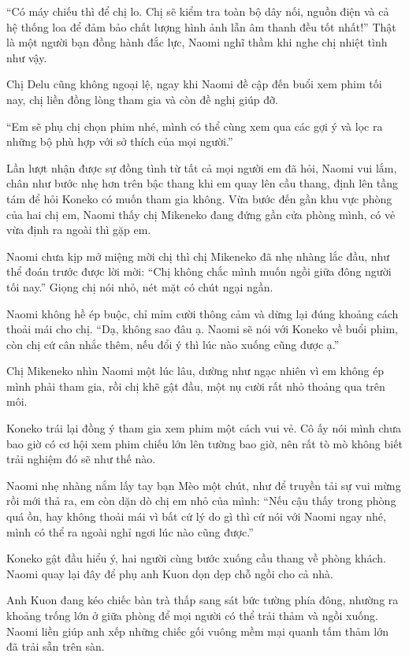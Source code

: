 \documentclass[../main.tex]{subfiles}
\begin{document}
``Có máy chiếu thì để chị lo. Chị sẽ kiểm tra toàn bộ dây nối, nguồn điện và cả hệ thống loa để đảm bảo chất lượng hình ảnh lẫn âm thanh đều tốt nhất!'' Thật là một người bạn đồng hành đắc lực, Naomi nghĩ thầm khi nghe chị nhiệt tình như vậy.

Chị Delu cũng không ngoại lệ, ngay khi Naomi đề cập đến buổi xem phim tối nay, chị liền đồng lòng tham gia và còn đề nghị giúp đỡ.

``Em sẽ phụ chị chọn phim nhé, mình có thể cùng xem qua các gợi ý và lọc ra những bộ phù hợp với sở thích của mọi người.''

Lần lượt nhận được sự đồng tình từ tất cả mọi người em đã hỏi, Naomi vui lắm, chân như bước nhẹ hơn trên bậc thang khi em quay lên cầu thang, định lên tầng tám để hỏi Koneko có muốn tham gia không. Vừa bước đến gần khu vực phòng của hai chị em, Naomi thấy chị Mikeneko đang đứng gần cửa phòng mình, có vẻ vừa định ra ngoài thì gặp em.

Naomi chưa kịp mở miệng mời chị thì chị Mikeneko đã nhẹ nhàng lắc đầu, như thể đoán trước được lời mời: ``Chị không chắc mình muốn ngồi giữa đông người tối nay.'' Giọng chị nói nhỏ, nét mặt có chút ngại ngần.

Naomi không hề ép buộc, chỉ mỉm cười thông cảm và dừng lại đúng khoảng cách thoải mái cho chị. ``Dạ, không sao đâu ạ. Naomi sẽ nói với Koneko về buổi phim, còn chị cứ cân nhắc thêm, nếu đổi ý thì lúc nào xuống cũng được ạ.''

Chị Mikeneko nhìn Naomi một lúc lâu, dường như ngạc nhiên vì em không ép mình phải tham gia, rồi chị khẽ gật đầu, một nụ cười rất nhỏ thoảng qua trên môi.

Koneko trái lại đồng ý tham gia xem phim một cách vui vẻ. Cô ấy nói mình chưa bao giờ có cơ hội xem phim chiếu lớn lên tường bao giờ, nên rất tò mò không biết trải nghiệm đó sẽ như thế nào.

Naomi nhẹ nhàng nắm lấy tay bạn Mèo một chút, như để truyền tải sự vui mừng rồi mới thả ra, em còn dặn dò chị em nhỏ của mình: ``Nếu cậu thấy trong phòng quá ồn, hay không thoải mái vì bất cứ lý do gì thì cứ nói với Naomi ngay nhé, mình có thể ra ngoài nghỉ ngơi lúc nào cũng được.''

Koneko gật đầu hiểu ý, hai người cùng bước xuống cầu thang về phòng khách. Naomi quay lại đây để phụ anh Kuon dọn dẹp chỗ ngồi cho cả nhà.

Anh Kuon đang kéo chiếc bàn trà thấp sang sát bức tường phía đông, nhường ra khoảng trống lớn ở giữa phòng để mọi người có thể trải thảm và ngồi xuống. Naomi liền giúp anh xếp những chiếc gối vuông mềm mại quanh tấm thảm lớn đã trải sẵn trên sàn.
\end{document}
